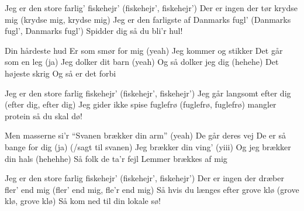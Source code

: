 \documentclass[a4paper,11pt]{article}
\begin{document}
\begin{song}
Jeg er den store farlig’ fiskehejr’
(fiskehejr’, fiskehejr’)
Der er ingen der tør krydse mig
(krydse mig, krydse mig)
Jeg er den farligste af Danmarks fugl’
(Danmarks fugl’, Danmarks fugl’)
Spidder dig så du bli’r hul!

Din hårdeste hud
Er som smør for mig (yeah)
Jeg kommer og stikker
Det går som en leg (ja)
Jeg dolker dit barn (yeah)
Og så dolker jeg dig (hehehe)
Det højeste skrig
Og så er det forbi

Jeg er den store farlig fiskehejr’
(fiskehejr’, fiskehejr’)
Jeg går langsomt efter dig
(efter dig, efter dig)
Jeg gider ikke spise fuglefrø
(fuglefrø, fuglefrø)
mangler protein så du skal dø!

 Men masserne si’r
“Svanen brækker din arm” (yeah)
De går deres vej 
De er så bange for dig (ja) (/sagt til svanen)
Jeg brækker din ving’ (yiii)
Og jeg brækker din hals (hehehhe)
Så folk de ta’r fejl
Lemmer brækkes af mig

Jeg er den store farlig fiskehejr’
(fiskehejr’, fiskehejr’)
Der er ingen der dræber fler’ end mig
(fler’ end mig, fle’r end mig)
Så hvis du længes efter grove klø
(grove klø, grove klø)
Så kom ned til din lokale sø!

\end{song}
\end{document}
